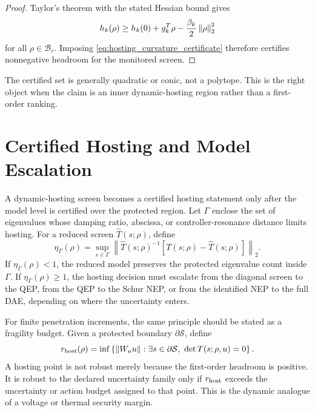 \begin{proof}
Taylor's theorem with the stated Hessian bound gives
\[
  h_k(\rho)
  \ge
  h_k(0)+g_k^T\rho-\frac{\beta_k}{2}\left\lVert \rho \right\rVert_2^2
\]
for all \(\rho\in\mathcal B_r\). Imposing
\eqref{eq:hosting_curvature_certificate} therefore certifies nonnegative
headroom for the monitored screen.
\end{proof}

The certified set is generally quadratic or conic, not a polytope. This is the
right object when the claim is an inner dynamic-hosting region rather than a
first-order ranking.

\section{Certified Hosting and Model Escalation}

A dynamic-hosting screen becomes a certified hosting statement only after the
model level is certified over the protected region. Let \(\Gamma\) enclose the
set of eigenvalues whose damping ratio, abscissa, or controller-resonance
distance limits hosting. For a reduced screen \(\widehat T(s;\rho)\), define
\begin{equation}
  \eta_\Gamma(\rho)
  =
  \sup_{s\in\Gamma}
  \left\|
  \widehat T(s;\rho)^{-1}
  \left[T(s;\rho)-\widehat T(s;\rho)\right]
  \right\|_2 .
  \label{eq:hosting_eta_gamma}
\end{equation}
If \(\eta_\Gamma(\rho)<1\), the reduced model preserves the protected
eigenvalue count inside \(\Gamma\). If \(\eta_\Gamma(\rho)\ge1\), the hosting
decision must escalate from the diagonal screen to the QEP, from the QEP to the
Schur NEP, or from the identified NEP to the full DAE, depending on where the
uncertainty enters.

For finite penetration increments, the same principle should be stated as a
fragility budget. Given a protected boundary \(\partial\mathcal S\), define
\begin{equation}
  r_{\rm host}(\rho)
  =
  \inf
  \left\{
  \|W_u u\|:
  \exists s\in\partial\mathcal S,\ 
  \det T(s;\rho,u)=0
  \right\}.
  \label{eq:hosting_fragility_budget}
\end{equation}
A hosting point is not robust merely because the first-order headroom is
positive. It is robust to the declared uncertainty family only if
\(r_{\rm host}\) exceeds the uncertainty or action budget assigned to that
point. This is the dynamic analogue of a voltage or thermal security margin.


